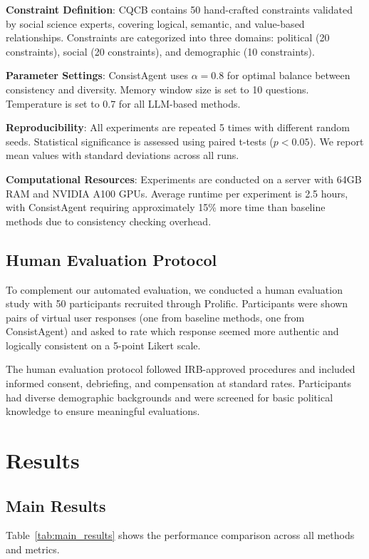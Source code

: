 \documentclass[sigconf, anonymous]{acmart}
\begin{document}
\textbf{Constraint Definition}: CQCB contains 50 hand-crafted constraints validated by social science experts, covering logical, semantic, and value-based relationships. Constraints are categorized into three domains: political (20 constraints), social (20 constraints), and demographic (10 constraints).

\textbf{Parameter Settings}: ConsistAgent uses $\alpha = 0.8$ for optimal balance between consistency and diversity. Memory window size is set to 10 questions. Temperature is set to 0.7 for all LLM-based methods.

\textbf{Reproducibility}: All experiments are repeated 5 times with different random seeds. Statistical significance is assessed using paired t-tests ($p < 0.05$). We report mean values with standard deviations across all runs.

\textbf{Computational Resources}: Experiments are conducted on a server with 64GB RAM and NVIDIA A100 GPUs. Average runtime per experiment is 2.5 hours, with ConsistAgent requiring approximately 15\% more time than baseline methods due to consistency checking overhead.

\subsection{Human Evaluation Protocol}

To complement our automated evaluation, we conducted a human evaluation study with 50 participants recruited through Prolific. Participants were shown pairs of virtual user responses (one from baseline methods, one from ConsistAgent) and asked to rate which response seemed more authentic and logically consistent on a 5-point Likert scale.

The human evaluation protocol followed IRB-approved procedures and included informed consent, debriefing, and compensation at standard rates. Participants had diverse demographic backgrounds and were screened for basic political knowledge to ensure meaningful evaluations.

\section{Results}

\subsection{Main Results}

Table~\ref{tab:main_results} shows the performance comparison across all methods and metrics.
\end{document}
